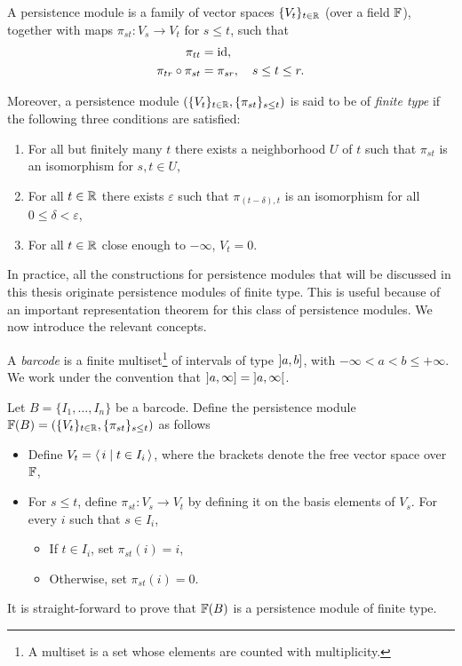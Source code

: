 \begin{definition}
A persistence module is a family of vector spaces $\{V_t\}_{t \in \mathbb{R}}$ (over a field $\mathbb{F}$), together with maps $\pi_{st} \colon V_s \to V_t$ for $s \leq t$, such that
\begin{align}
\pi_{tt} &= \mathrm{id},\\
\pi_{tr} \circ \pi_{st} &= \pi_{sr}, \quad s \leq t \leq r.
\end{align}

Moreover, a persistence module $(\{V_t\}_{t \in \mathbb{R}}, \{\pi_{st}\}_{s\leq t})$ is said to be of \emph{finite type} if the following three conditions are satisfied:
\begin{enumerate}
\item For all but finitely many $t$ there exists a neighborhood $U$ of $t$ such that $\pi_{st}$ is an isomorphism for $s, t \in U$,
\item For all $t \in \mathbb{R}$ there exists $\varepsilon$ such that $\pi_{(t-\delta), t}$ is an isomorphism for all $0 \leq \delta < \varepsilon$,
\item\label{pm3} For all $t \in \mathbb{R}$ close enough to $-\infty$, $V_t = 0$.
\end{enumerate}
\end{definition}

In practice, all the constructions for persistence modules that will be discussed in this thesis originate persistence modules of finite type. This is useful because of an important representation theorem for this class of persistence modules. We now introduce the relevant concepts.

\begin{definition}
A \emph{barcode} is a finite multiset\footnote{A multiset is a set whose elements are counted with multiplicity.} of intervals of type $\linterval a b$, with $-\infty < a < b \leq +\infty$. We work under the convention that $\linterval a \infty = \ointerval a \infty$.
\end{definition}

\begin{definition}
Let $B = \{I_1, \dots, I_n\}$ be a barcode. Define the persistence module $\mathbb{F}(B) = (\{V_t\}_{t \in \mathbb{R}}, \{\pi_{st}\}_{s \leq t})$ as follows
\begin{itemize}
\item Define $V_t = \langle\,i \mid t \in I_i\,\rangle$, where the brackets denote the free vector space over $\mathbb{F}$,
\item For $s \leq t$, define $\pi_{st} \colon V_s \to V_t$ by defining it on the basis elements of $V_s$. For every $i$ such that $s \in I_i$,
\begin{itemize}
\item If $t \in I_i$, set $\pi_{st}(i) = i$,
\item Otherwise, set $\pi_{st}(i) = 0$.
\end{itemize}
\end{itemize}

It is straight-forward to prove that $\mathbb{F}(B)$ is a persistence module of finite type.
\end{definition}

